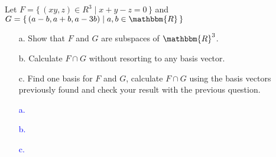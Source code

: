 \documentclass[a4paper,12pt]{article}
\newcommand{\Br}[1]{\{\, #1 \,\}}
\newcommand{\R}{\mathbbm{R}}
\begin{document}
\subsection{}
Let $F = \Br{(xy,z) \in R^3 \mid x+y-z=0}$ and $G = \Br{(a-b,a+b,a-3b) \mid a,b \in \R}$
\begin{itemize}
 \item [a.] Show that $F$ and $G$ are subspaces of $\R^3$.
 \item [b.] Calculate $F \cap G$ without resorting to any basis vector.
 \item [c.] Find one basis for $F$ and $G$, calculate $F \cap G$ using the basis vectors previously found and check your result with the previous question.
\end{itemize}
\textcolor{blue}{
\begin{itemize}
 \item [a.] 
 \item [b.] 
 \item [c.] 
\end{itemize}
}
\end{document}
